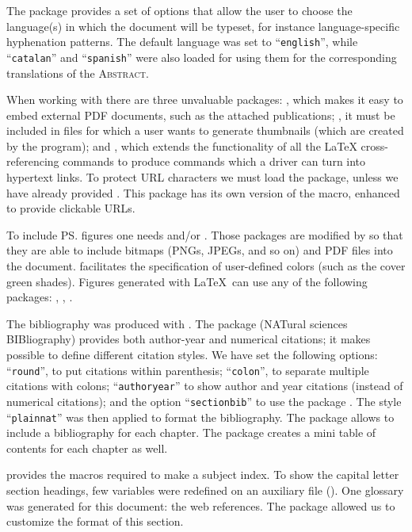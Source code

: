 The  package provides a set of options that allow the user
to choose the language(s) in which the document will be typeset, for
instance language-specific hyphenation patterns. The default language
was set to ``\texttt{english}'', while ``\texttt{catalan}'' and
``\texttt{spanish}'' were also loaded for using them for the
corresponding translations of the \textsc{Abstract}.

When working with  there are three unvaluable packages:
, which makes it easy to embed external PDF documents,
such as the attached publications;
, it must be included in files for which a user wants
to generate thumbnails (which are created by the 
program); and , which extends the functionality of all
the \LaTeX{} cross-referencing commands to produce 
commands which a driver can turn into hypertext links.  To protect URL
characters we must load the  package, unless we have already provided
. This package has its own version of the 
macro, enhanced to provide clickable URLs.

To include \ps{} figures one needs  and/or
. Those packages are modified by
 so that they are able to include bitmaps
(PNGs, JPEGs, and so on) and PDF files into the document. 
facilitates the specification of user-defined colors (such as the
cover green shades). Figures generated with \LaTeX\ can use any of the
following packages: , , .

The bibliography was produced with \BiBTeX. The package 
(NATural sciences BIBliography) provides both author-year and
numerical citations; it makes possible to define different
citation styles. We have set the following options:
``\texttt{round}'', to put citations within parenthesis;
``\texttt{colon}'', to separate multiple citations with colons;
``\texttt{authoryear}'' to show author and year citations (instead of
numerical citations); and the option ``\texttt{sectionbib}'' to use
the package . The style ``\texttt{plainnat}'' was then applied
to format the bibliography. The package  allows to include
a bibliography for each chapter. The package  creates
a mini table of contents for each chapter as well. 

 provides the macros required to make a subject
index. To show the capital letter section headings, few variables were
redefined on an auxiliary file ().
One glossary was generated for this document: the web references. 
The package  allowed us to customize the format of this 
section.

